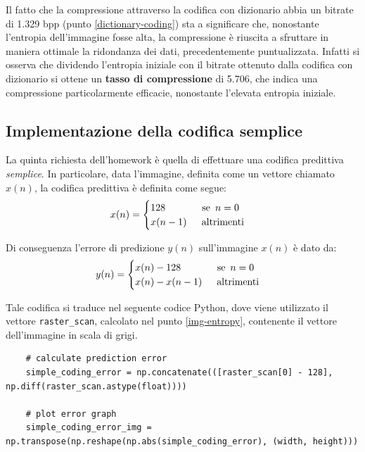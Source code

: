 Il fatto che la compressione attraverso la codifica con dizionario abbia un bitrate di 1.329 bpp (punto \ref{dictionary-coding}) sta a significare che, nonostante l'entropia dell'immagine fosse alta, la compressione è riuscita a sfruttare in maniera ottimale la ridondanza dei dati, precedentemente puntualizzata. Infatti si osserva che dividendo l'entropia iniziale con il bitrate ottenuto dalla codifica con dizionario si ottene un \textbf{tasso di compressione} di 5.706, che indica una compressione particolarmente efficacie, nonostante l'elevata entropia iniziale.



\vspace{15px}\subsection{Implementazione della codifica semplice}\label{simple-coding}
La quinta richiesta dell'homework è quella di effettuare una codifica predittiva \textsl{semplice}. In particolare, data l'immagine, definita come un vettore chiamato $x(n)$, la codifica predittiva è definita come segue:
\begin{gather*}
    x(n) = 
    \begin{cases}
        128 \hspace{37px} \text{se } \, n = 0 \\
        x(n - 1) \hspace{15px} \text{altrimenti}\\
    \end{cases}
\end{gather*}

\noindent Di conseguenza l'errore di predizione $y(n)$ sull'immagine $x(n)$ è dato da:
\begin{gather*}
    y(n) = 
    \begin{cases}
        x(n) - 128 \hspace{37px} \text{se } \, n = 0 \\
        x(n) - x(n - 1) \hspace{15px} \text{altrimenti}\\
    \end{cases}
\end{gather*}

\noindent Tale codifica si traduce nel seguente codice Python, dove viene utilizzato il vettore \texttt{raster\_scan}, calcolato nel punto \ref{img-entropy}, contenente il vettore dell'immagine in scala di grigi.

\begin{lstlisting}
    # calculate prediction error
    simple_coding_error = np.concatenate(([raster_scan[0] - 128], np.diff(raster_scan.astype(float))))

    # plot error graph
    simple_coding_error_img = np.transpose(np.reshape(np.abs(simple_coding_error), (width, height)))

\end{lstlisting}

